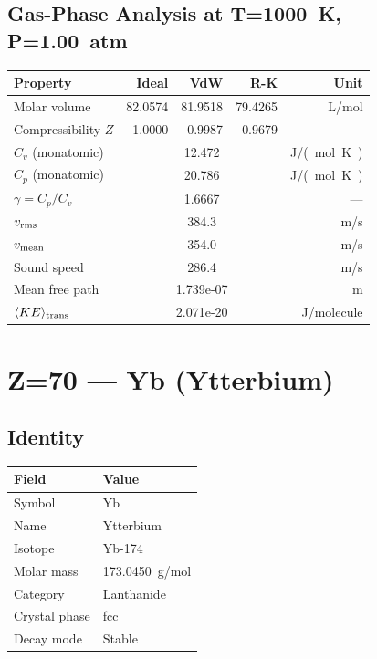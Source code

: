 \documentclass[11pt,a4paper]{article}
\begin{document}
\subsection{Gas-Phase Analysis at T=\SI{1000}{K}, P=\SI{1.00}{atm}}
\begin{tabular}{lrrrr}
  \toprule
  Property & Ideal & VdW & R-K & Unit \\
  \midrule
  Molar volume & 82.0574 & 81.9518 & 79.4265 & \si{L/mol} \\
  Compressibility $Z$ & 1.0000 & 0.9987 & 0.9679 & --- \\
  \midrule
  $C_v$ (monatomic) & \multicolumn{3}{c}{12.472} & \si{J/(mol.K)} \\
  $C_p$ (monatomic) & \multicolumn{3}{c}{20.786} & \si{J/(mol.K)} \\
  $\gamma = C_p/C_v$ & \multicolumn{3}{c}{1.6667} & --- \\
  $v_{\rm rms}$ & \multicolumn{3}{c}{384.3} & \si{m/s} \\
  $v_{\rm mean}$ & \multicolumn{3}{c}{354.0} & \si{m/s} \\
  Sound speed & \multicolumn{3}{c}{286.4} & \si{m/s} \\
  Mean free path & \multicolumn{3}{c}{1.739e-07} & \si{m} \\
  $\langle KE \rangle_{\rm trans}$ & \multicolumn{3}{c}{2.071e-20} & \si{J/molecule} \\
  \bottomrule
\end{tabular}

\newpage

\section{Z=70 --- Yb (Ytterbium)}
\label{sec:Z70}

\subsection{Identity}
\begin{tabular}{ll}
  \toprule
  Field & Value \\
  \midrule
  Symbol & Yb \\
  Name & Ytterbium \\
  Isotope & Yb-174 \\
  Molar mass & \SI{173.0450}{g/mol} \\
  Category & Lanthanide \\
  Crystal phase & fcc \\
  Decay mode & Stable \\
  \bottomrule
\end{tabular}
\end{document}
